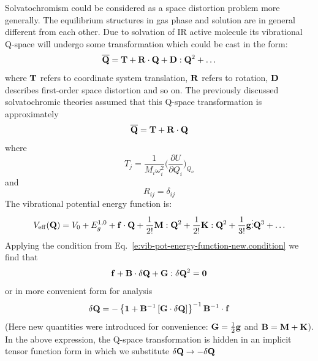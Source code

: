 \documentclass[a4paper,titlepage,twoside,fleqn,12pt]{book}
\newcommand{\FDer}[3]{\ensuremath{
\bigg(
\frac{\partial #1}{\partial #2}
\bigg)_{#3}}}
\begin{document}
\begin{refsection}
Solvatochromism could be considered as a space distortion problem more generally.
The equilibrium structures
in gas phase and solution are in general different from each other.
Due to solvation of IR active molecule its vibrational Q-space will
undergo some transformation which could be cast in the form:
%
\begin{equation}\label{Q-space-transform}
{\bf \overline{Q}} = {\bf T} + {\bf R} \cdot {\bf Q} + {\bf D} : {\bf Q}^2 + \ldots
\end{equation}
%
where ${\bf T}$ refers to coordinate system translation, ${\bf R}$ refers to rotation,
${\bf D}$ describes first\hyp{}order space distortion and so on. The previously
discussed solvatochromic theories assumed that this Q-space transformation is approximately
%
\begin{equation}\label{Q-space-transform-theory-0}
{\bf \overline{Q}} = {\bf T} + {\bf R} \cdot {\bf Q}
\end{equation}
%
where 
%
\begin{equation}\label{T-th-0}
T_j = \frac{1}{M_i\omega_i^2}\FDer{U}{Q_i}{Q_o}
\end{equation}
and
\begin{equation}\label{R-th-0}
R_{ij} = \delta_{ij}
\end{equation}
%
The vibrational potential energy function is:
%
\begin{equation}\label{V}
V_{\rm eff} ({\bf Q})
= V_0 + E^{\rm 1,0}_g + {\bf f} \cdot {\bf Q} + \frac{1}{2!} {\bf M} : {\bf Q}^2 + 
\frac{1}{2!} {\bf K} : {\bf Q}^2 + \frac{1}{3!} {\bf g} \vdots {\bf Q}^3 + \ldots
\end{equation}
%
Applying the condition from Eq.~\eqref{e:vib-pot-energy-function-new.condition} we find that
%
\begin{equation}\label{dQ-new}
{\bf f} + {\bf B} \cdot \delta {\bf Q} + {\bf G} : \delta{\bf Q}^2 = {\bf 0}
\end{equation}
%
or in more convenient form for analysis
%
\begin{equation}\label{dQ-new-c}
\delta {\bf Q} = 
-\left\{ 
       {\bf 1} + {\bf B}^{-1} \left[ {\bf G} \cdot \delta {\bf Q} \right]
\right\}^{-1} {\bf B}^{-1} \cdot {\bf f}
\end{equation}
%
(Here new quantities were introduced for convenience: ${\bf G} = \frac{1}{2} {\bf g}$
and ${\bf B} = {\bf M} + {\bf K}$). 
In the above expression, the Q-space transformation is hidden in an implicit tensor
function form in which we substitute $\delta {\bf Q}\rightarrow -\delta {\bf Q}$

\end{refsection}
\end{document}
